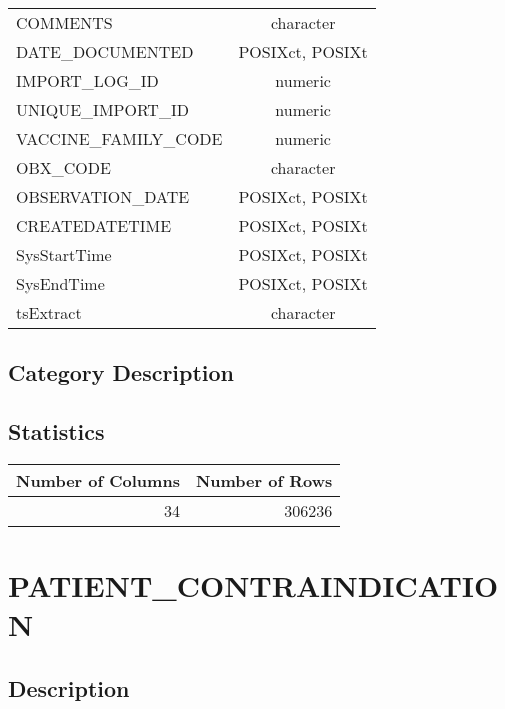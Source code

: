 \documentclass[
  letterpaper,
  DIV=11,
  numbers=noendperiod]{scrreprt}
\begin{document}
\begin{longtable}{lc}
COMMENTS & character \\ 
DATE\_DOCUMENTED & POSIXct, POSIXt \\ 
IMPORT\_LOG\_ID & numeric \\ 
UNIQUE\_IMPORT\_ID & numeric \\ 
VACCINE\_FAMILY\_CODE & numeric \\ 
OBX\_CODE & character \\ 
OBSERVATION\_DATE & POSIXct, POSIXt \\ 
CREATEDATETIME & POSIXct, POSIXt \\ 
SysStartTime & POSIXct, POSIXt \\ 
SysEndTime & POSIXct, POSIXt \\ 
tsExtract & character \\ 
\bottomrule
\end{longtable}

\hypertarget{category-description-25}{%
\section*{Category Description}\label{category-description-25}}

\hypertarget{statistics-25}{%
\section*{Statistics}\label{statistics-25}}

\begin{longtable}{rr}
\toprule
Number of Columns & Number of Rows \\ 
\midrule
34 & 306236 \\ 
\bottomrule
\end{longtable}

\hypertarget{patient_contraindication}{%
\chapter*{PATIENT\_CONTRAINDICATION}\label{patient_contraindication}}

\hypertarget{description-26}{%
\section*{Description}\label{description-26}}
\end{document}
